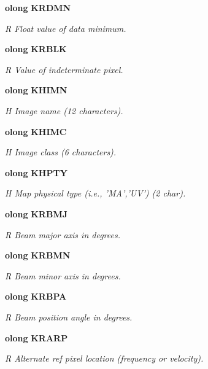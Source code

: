 \begin{CompactItemize}
{\bf olong} {\bf KRDMN}
\begin{CompactList}\small\item\em R Float value of data minimum. \item\end{CompactList}\item 
{\bf olong} {\bf KRBLK}
\begin{CompactList}\small\item\em R Value of indeterminate pixel. \item\end{CompactList}\item 
{\bf olong} {\bf KHIMN}
\begin{CompactList}\small\item\em H Image name (12 characters). \item\end{CompactList}\item 
{\bf olong} {\bf KHIMC}
\begin{CompactList}\small\item\em H Image class (6 characters). \item\end{CompactList}\item 
{\bf olong} {\bf KHPTY}
\begin{CompactList}\small\item\em H Map physical type (i.e., 'MA','UV') (2 char). \item\end{CompactList}\item 
{\bf olong} {\bf KRBMJ}
\begin{CompactList}\small\item\em R Beam major axis in degrees. \item\end{CompactList}\item 
{\bf olong} {\bf KRBMN}
\begin{CompactList}\small\item\em R Beam minor axis in degrees. \item\end{CompactList}\item 
{\bf olong} {\bf KRBPA}
\begin{CompactList}\small\item\em R Beam position angle in degrees. \item\end{CompactList}\item 
{\bf olong} {\bf KRARP}
\begin{CompactList}\small\item\em R Alternate ref pixel location (frequency or velocity). \item\end{CompactList}\item 

\end{CompactItemize}
